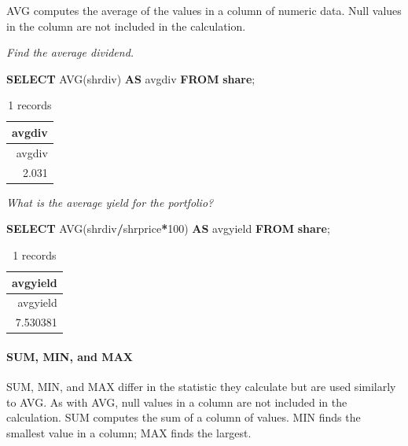 \documentclass[
]{article}
\newenvironment{Shaded}{\begin{snugshade}}{\end{snugshade}}
\newcommand{\DecValTok}[1]{\textcolor[rgb]{0.00,0.00,0.81}{#1}}
\newcommand{\FunctionTok}[1]{\textcolor[rgb]{0.00,0.00,0.00}{#1}}
\newcommand{\KeywordTok}[1]{\textcolor[rgb]{0.13,0.29,0.53}{\textbf{#1}}}
\newcommand{\NormalTok}[1]{#1}
\newcommand{\OperatorTok}[1]{\textcolor[rgb]{0.81,0.36,0.00}{\textbf{#1}}}
\begin{document}
AVG computes the average of the values in a column of numeric data. Null
values in the column are not included in the calculation.

\emph{Find the average dividend.}

\begin{Shaded}
\begin{Highlighting}[]
\KeywordTok{SELECT} \FunctionTok{AVG}\NormalTok{(shrdiv) }\KeywordTok{AS}\NormalTok{ avgdiv }\KeywordTok{FROM} \KeywordTok{share}\NormalTok{;}
\end{Highlighting}
\end{Shaded}

\begin{longtable}[]{@{}r@{}}
\caption{1 records}\tabularnewline
\toprule()
avgdiv \\
\midrule()
\endfirsthead
\toprule()
avgdiv \\
\midrule()
\endhead
2.031 \\
\bottomrule()
\end{longtable}

\emph{What is the average yield for the portfolio?}

\begin{Shaded}
\begin{Highlighting}[]
\KeywordTok{SELECT} \FunctionTok{AVG}\NormalTok{(shrdiv}\OperatorTok{/}\NormalTok{shrprice}\OperatorTok{*}\DecValTok{100}\NormalTok{) }\KeywordTok{AS}\NormalTok{ avgyield }\KeywordTok{FROM} \KeywordTok{share}\NormalTok{;}
\end{Highlighting}
\end{Shaded}

\begin{longtable}[]{@{}r@{}}
\caption{1 records}\tabularnewline
\toprule()
avgyield \\
\midrule()
\endfirsthead
\toprule()
avgyield \\
\midrule()
\endhead
7.530381 \\
\bottomrule()
\end{longtable}

\hypertarget{sum-min-and-max}{%
\paragraph{SUM, MIN, and MAX}\label{sum-min-and-max}}

SUM, MIN, and MAX differ in the statistic they calculate but are used
similarly to AVG. As with AVG, null values in a column are not included
in the calculation. SUM computes the sum of a column of values. MIN
finds the smallest value in a column; MAX finds the largest.
\end{document}
